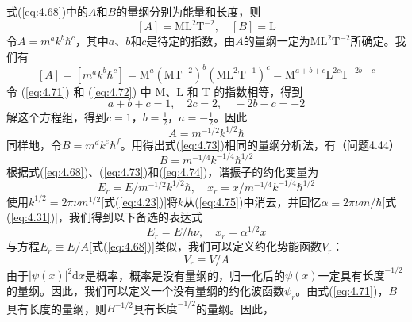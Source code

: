     式(\ref{eq:4.68})中的$A$和$B$的量纲分别为能量和长度，则
    \begin{equation}
        \left[A\right] = \mathrm{M}\mathrm{L}^2\mathrm{T}^{-2}, \quad \left[B\right] = \mathrm{L}
        \label{eq:4.71}
    \end{equation}
    \indent 令$A = m^ak^b\hbar^c$，其中$a$、$b$和$c$是待定的指数，由$A$的量纲一定为$\mathrm{M}\mathrm{L}^2\mathrm{T}^{-2}$所确定。我们有
    \begin{equation}
        \left[A\right] = \left[m^ak^b\hbar^c\right] = \mathrm{M}^a\left(\mathrm{M}\mathrm{T}^{-2}\right)^b\left(\mathrm{M}\mathrm{L}^2\mathrm{T}^{-1}\right)^c = \mathrm{M}^{a+b+c}\mathrm{L}^{2c}\mathrm{T}^{-2b-c}
        \label{eq:4.72}
    \end{equation}
    令 (\ref{eq:4.71}) 和 (\ref{eq:4.72}) 中 M、L 和 T 的指数相等，得到
    \begin{equation*}
        a+b+c = 1, \quad 2c = 2, \quad -2b-c = -2
    \end{equation*}
    解这个方程组，得到$c=1$，$b=\frac{1}{2}$，$a=-\frac{1}{2}$。因此
    \begin{equation}
        A = m^{-1/2}k^{1/2}\hbar
        \label{eq:4.73}
    \end{equation}
    \indent 同样地，令$B = m^dk^e\hbar^f$。用得出式(\ref{eq:4.73})相同的量纲分析法，有（问题4.44）
    \begin{equation}
        B = m^{-1/4}k^{-1/4}\hbar^{1/2}
        \label{eq:4.74}
    \end{equation}
    \indent 根据式(\ref{eq:4.68})、(\ref{eq:4.73})和(\ref{eq:4.74})，谐振子的约化变量为
    \begin{equation}
        E_r = E / m^{-1/2}k^{1/2}\hbar, \quad x_r = x / m^{-1/4}k^{-1/4}\hbar^{1/2}
        \label{eq:4.75}
    \end{equation}
    使用$k^{1/2} = 2\pi\nu m^{1/2}$[式(\ref{eq:4.23})]将$k$从(\ref{eq:4.75})中消去，并回忆$\alpha \equiv 2\pi\nu m/\hbar$[式(\ref{eq:4.31})]，我们得到以下备选的表达式
    \begin{equation}
        E_r = E /h\nu, \quad x_r = \alpha ^{1/2}x
        \label{eq:4.76}
    \end{equation}
    \indent 与方程$E_r \equiv E/A$[式(\ref{eq:4.68})]类似，我们可以定义约化势能函数$V_r$：
    \begin{equation}
        V_r \equiv V / A
        \label{eq:4.77}
    \end{equation}
    \indent 由于$\left|\psi\left(x\right)\right|^2\mathrm{d}x$是概率，概率是没有量纲的，归一化后的$\psi\left(x\right)$一定具有$\text{长度}^{-1/2}$的量纲。因此，我们可以定义一个没有量纲的约化波函数$\psi_r$。由式(\ref{eq:4.71})，$B$具有长度的量纲，则$B^{-1/2}$具有$\text{长度}^{-1/2}$的量纲。因此，
